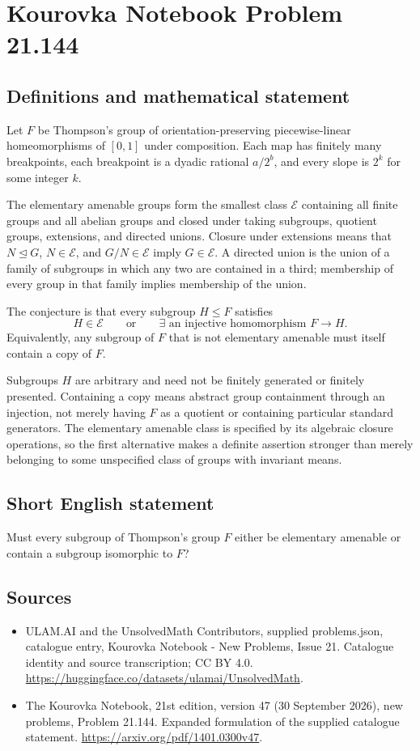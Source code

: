 \documentclass[11pt,a4paper]{article}
\begin{document}
\section*{Kourovka Notebook Problem 21.144}\label{statement}

\subsection{Definitions and mathematical statement}
Let $F$ be Thompson's group of orientation-preserving piecewise-linear homeomorphisms of $[0,1]$ under composition. Each map has finitely many breakpoints, each breakpoint is a dyadic rational $a/2^b$, and every slope is $2^k$ for some integer $k$.

The elementary amenable groups form the smallest class $\mathcal E$ containing all finite groups and all abelian groups and closed under taking subgroups, quotient groups, extensions, and directed unions. Closure under extensions means that $N\trianglelefteq G$, $N\in\mathcal E$, and $G/N\in\mathcal E$ imply $G\in\mathcal E$. A directed union is the union of a family of subgroups in which any two are contained in a third; membership of every group in that family implies membership of the union.

The conjecture is that every subgroup $H\le F$ satisfies
\[
 H\in\mathcal E\qquad\text{or}\qquad
 \exists\text{ an injective homomorphism }F\longrightarrow H.
\]
Equivalently, any subgroup of $F$ that is not elementary amenable must itself contain a copy of $F$.

Subgroups $H$ are arbitrary and need not be finitely generated or finitely presented. Containing a copy means abstract group containment through an injection, not merely having $F$ as a quotient or containing particular standard generators. The elementary amenable class is specified by its algebraic closure operations, so the first alternative makes a definite assertion stronger than merely belonging to some unspecified class of groups with invariant means.
\subsection{Short English statement}
Must every subgroup of Thompson’s group $F$ either be elementary amenable or contain a subgroup isomorphic to $F$?
\subsection{Sources}
\begin{itemize}
\item[S1] ULAM.AI and the UnsolvedMath Contributors, supplied problems.json, catalogue entry, Kourovka Notebook - New Problems, Issue 21. Catalogue identity and source transcription; CC BY 4.0.
\url{https://huggingface.co/datasets/ulamai/UnsolvedMath}.
\item[S2] The Kourovka Notebook, 21st edition, version 47 (30 September 2026), new problems, Problem 21.144. Expanded formulation of the supplied catalogue statement.
\url{https://arxiv.org/pdf/1401.0300v47}.
\end{itemize}
\end{document}
